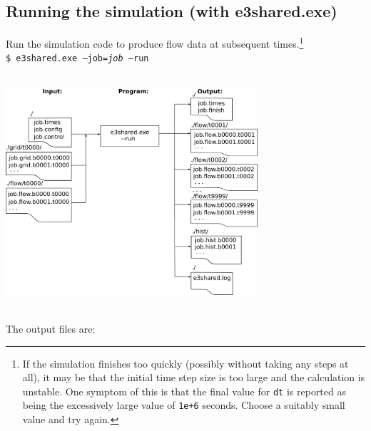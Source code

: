 \subsection{Running the simulation (with e3shared.exe)} 
Run the simulation code to produce flow data at subsequent times.\footnote{If the simulation
finishes too quickly (possibly without taking any steps at all),
it may be that the initial time step size is too large and the calculation is unstable.
One symptom of this is that the final value for \texttt{dt} is reported as being
the excessively large value of \texttt{1e+6} seconds.
Choose a suitably small value and try again.}\\ 
         \texttt{\$ e3shared.exe --job=\textit{job} --run}\\
         \vspace{0.25cm} \\
         \centerline{\includegraphics[width=0.7\textwidth]{figs/running-sim.png}}\\
         The output files are:

